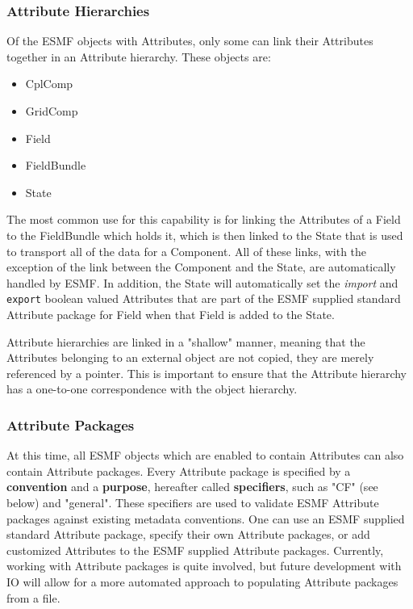 \subsubsection{Attribute Hierarchies}

Of the ESMF objects with Attributes, only some can link their Attributes together in an Attribute hierarchy.  These objects are:

\begin{itemize}
\item CplComp
\item GridComp
\item Field
\item FieldBundle
\item State
\end{itemize}

The most common use for this capability is for linking the Attributes of a Field to the FieldBundle which holds it, which is then linked to the State that is used to transport all of the data for a Component.  All of these links, with the exception of the link between the Component and the State, are automatically handled by ESMF.  In addition, the State will automatically set the {\it import} and {\tt export} boolean valued Attributes that are part of the ESMF supplied standard Attribute package for Field when that Field is added to the State. 

Attribute hierarchies are linked in a "shallow" manner, meaning that the Attributes belonging to an external object are not copied, they are merely referenced by a pointer.  This is important to ensure that the Attribute hierarchy has a one-to-one correspondence with the object hierarchy.  

\subsubsection{Attribute Packages}

At this time, all ESMF objects which are enabled to contain Attributes can also contain Attribute packages.  Every Attribute package is specified by a {\bf convention} and a {\bf purpose}, hereafter called {\bf specifiers}, such as "CF" (see below) and "general".  These specifiers are used to validate ESMF Attribute packages against existing metadata conventions.  One can use an ESMF supplied standard Attribute package, specify their own Attribute packages, or add customized Attributes to the ESMF supplied Attribute packages.  Currently, working with Attribute packages is quite involved, but future development with IO will allow for a more automated approach to populating Attribute packages from a file.

